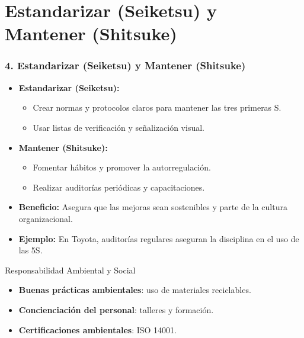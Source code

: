\documentclass{beamer}
\begin{document}
\section{Estandarizar (Seiketsu) y Mantener (Shitsuke)}
\begin{frame}
\frametitle{4. Estandarizar (Seiketsu) y Mantener (Shitsuke)}
\begin{itemize}
    \item \textbf{Estandarizar (Seiketsu):}
        \begin{itemize}
            \item Crear normas y protocolos claros para mantener las tres primeras S.
            \item Usar listas de verificación y señalización visual.
        \end{itemize}
    \item \textbf{Mantener (Shitsuke):}
        \begin{itemize}
            \item Fomentar hábitos y promover la autorregulación.
            \item Realizar auditorías periódicas y capacitaciones.
        \end{itemize}
    \item \textbf{Beneficio:} Asegura que las mejoras sean sostenibles y parte de la cultura organizacional.
    \item \textbf{Ejemplo:} En Toyota, auditorías regulares aseguran la disciplina en el uso de las 5S.
\end{itemize}
\end{frame}


\begin{frame}{Responsabilidad Ambiental y Social}
    \begin{itemize}
        \item \textbf{Buenas prácticas ambientales}: uso de materiales reciclables.
        \item \textbf{Concienciación del personal}: talleres y formación.
        \item \textbf{Certificaciones ambientales}: ISO 14001.
    \end{itemize}
\end{frame}
\end{document}
